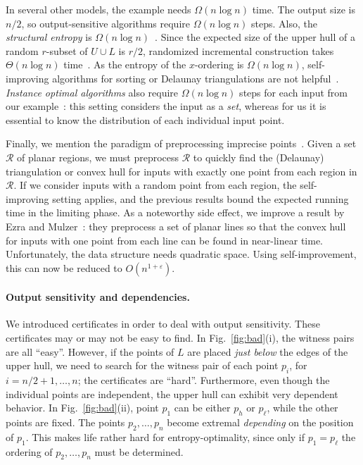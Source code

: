 \documentclass[letterpaper,11pt]{article}
\newcommand{\eps}{\varepsilon}
\newcommand{\cR}{\mathcal{R}}
\begin{document}
In several other models, the 
example needs $\Omega(n\log n)$ 
time. The output size is $n/2$, so 
output-sensitive algorithms require 
$\Omega(n\log n)$ steps. Also, 
the \emph{structural entropy}
is $\Omega(n\log n)$~\cite{Barbay}. 
Since the expected size of the
upper hull of a random $r$-subset 
of $U\cup L$ is $r/2$, 
randomized incremental construction 
takes $\Theta(n\log n)$ time~\cite{CS89}. 
As the entropy of the 
$x$-ordering is $\Omega(n\log n)$, 
self-improving algorithms
for sorting or Delaunay
triangulations are not
helpful~\cite{AilonCCLMS11}.
\emph{Instance optimal algorithms}
also require $\Omega(n \log n)$
steps for each input from our 
example~\cite{AfshaniBC09}: 
this setting 
considers the input as a \emph{set}, 
whereas for us
it is essential to know the distribution of
each individual input point.

Finally, we mention the paradigm of 
preprocessing imprecise
points~\cite{BuchinLoMoMu11,EzraMu13,HeldMi08,LoefflerSn10,vKreveldLoMi10}.
Given a set $\cR$ of 
planar regions, we must 
preprocess $\cR$ to 
quickly find the (Delaunay) 
triangulation or convex hull 
for inputs with exactly 
one point from each region 
in $\cR$.  If we consider inputs 
with a random point from each 
region, the self-improving setting applies,
and the previous results 
bound the expected
running time in the limiting phase.
As a noteworthy side effect, we 
improve a result
by Ezra and Mulzer~\cite{EzraMu13}:
they preprocess a set of
planar lines so that
the convex hull for 
inputs with one point from each
line can be found in near-linear
time. Unfortunately, the data structure
needs quadratic space.
Using self-improvement,
this can now be reduced
to $O(n^{1+\eps})$.

\paragraph{Output sensitivity and dependencies.}
We introduced certificates in 
order to deal with output 
sensitivity. These certificates
may or may not be easy 
to find. In Fig.~\ref{fig:bad}(i), 
the witness pairs are all 
``easy''. However, if 
the points of $L$ are placed
\emph{just below} the edges 
of the upper hull, we need 
to search for the witness 
pair of each point $p_i$, 
for $i=n/2+1, \dots, n$;
the certificates are
``hard''. Furthermore, 
even though the individual 
points are independent, the 
upper hull can exhibit 
very dependent behavior. 
In Fig.~\ref{fig:bad}(ii),
point $p_1$ can be either 
$p_h$ or $p_\ell$, while 
the other points are fixed. 
The points $p_2, \dots, p_n$ 
become extremal \emph{depending} 
on the position of $p_1$. This 
makes life rather hard for 
entropy-optimality, since only 
if $p_1=p_\ell$ the ordering of 
$p_2,\dots, p_n$ must be determined.
\end{document}
